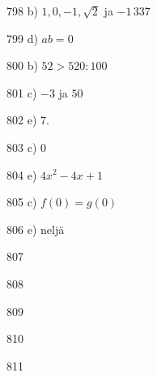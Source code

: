\begin{Vastaus}{798}
	b) $1, 0, -1, \sqrt{2}$ ja $-1\,337$
	
\end{Vastaus}
\begin{Vastaus}{799}
d) $ab = 0$
	
\end{Vastaus}
\begin{Vastaus}{800}
b) $52 > 520:100$
	
\end{Vastaus}
\begin{Vastaus}{801}
c) $-3$ ja $50$ %
	
\end{Vastaus}
\begin{Vastaus}{802}
e) $7.$
	
\end{Vastaus}
\begin{Vastaus}{803}
c) $0$
	
\end{Vastaus}
\begin{Vastaus}{804}
e) $4x^2-4x+1$
	
\end{Vastaus}
\begin{Vastaus}{805}
	c) $f(0) = g(0)$
	
\end{Vastaus}
\begin{Vastaus}{806}
	e) neljä
	
\end{Vastaus}
\begin{Vastaus}{807}
	
\end{Vastaus}
\begin{Vastaus}{808}
	
\end{Vastaus}
\begin{Vastaus}{809}
    
\end{Vastaus}
\begin{Vastaus}{810}
    
\end{Vastaus}
\begin{Vastaus}{811}
    
\end{Vastaus}
